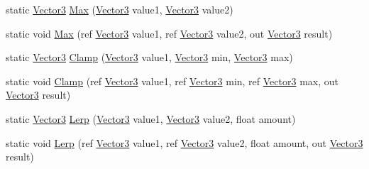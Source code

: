 \begin{DoxyCompactItemize}
\item 
static \hyperlink{struct_microsoft_1_1_xna_1_1_framework_1_1_vector3}{Vector3} \hyperlink{struct_microsoft_1_1_xna_1_1_framework_1_1_vector3_a9cf7048dc7ed52da302507047206cfba}{Max} (\hyperlink{struct_microsoft_1_1_xna_1_1_framework_1_1_vector3}{Vector3} value1, \hyperlink{struct_microsoft_1_1_xna_1_1_framework_1_1_vector3}{Vector3} value2)
\item 
static void \hyperlink{struct_microsoft_1_1_xna_1_1_framework_1_1_vector3_a258028e6718baca3de899a104a27d4ee}{Max} (ref \hyperlink{struct_microsoft_1_1_xna_1_1_framework_1_1_vector3}{Vector3} value1, ref \hyperlink{struct_microsoft_1_1_xna_1_1_framework_1_1_vector3}{Vector3} value2, out \hyperlink{struct_microsoft_1_1_xna_1_1_framework_1_1_vector3}{Vector3} result)
\item 
static \hyperlink{struct_microsoft_1_1_xna_1_1_framework_1_1_vector3}{Vector3} \hyperlink{struct_microsoft_1_1_xna_1_1_framework_1_1_vector3_a1f73c49b5e7cde44b0730444c7936026}{Clamp} (\hyperlink{struct_microsoft_1_1_xna_1_1_framework_1_1_vector3}{Vector3} value1, \hyperlink{struct_microsoft_1_1_xna_1_1_framework_1_1_vector3}{Vector3} min, \hyperlink{struct_microsoft_1_1_xna_1_1_framework_1_1_vector3}{Vector3} max)
\item 
static void \hyperlink{struct_microsoft_1_1_xna_1_1_framework_1_1_vector3_a9dc75c4c2a2ba70c28524f9348ee663b}{Clamp} (ref \hyperlink{struct_microsoft_1_1_xna_1_1_framework_1_1_vector3}{Vector3} value1, ref \hyperlink{struct_microsoft_1_1_xna_1_1_framework_1_1_vector3}{Vector3} min, ref \hyperlink{struct_microsoft_1_1_xna_1_1_framework_1_1_vector3}{Vector3} max, out \hyperlink{struct_microsoft_1_1_xna_1_1_framework_1_1_vector3}{Vector3} result)
\item 
static \hyperlink{struct_microsoft_1_1_xna_1_1_framework_1_1_vector3}{Vector3} \hyperlink{struct_microsoft_1_1_xna_1_1_framework_1_1_vector3_a9e65a924edd5bdbb31429f0ab25d8923}{Lerp} (\hyperlink{struct_microsoft_1_1_xna_1_1_framework_1_1_vector3}{Vector3} value1, \hyperlink{struct_microsoft_1_1_xna_1_1_framework_1_1_vector3}{Vector3} value2, float amount)
\item 
static void \hyperlink{struct_microsoft_1_1_xna_1_1_framework_1_1_vector3_a07379b97d42c2a976449b2468a9dfadb}{Lerp} (ref \hyperlink{struct_microsoft_1_1_xna_1_1_framework_1_1_vector3}{Vector3} value1, ref \hyperlink{struct_microsoft_1_1_xna_1_1_framework_1_1_vector3}{Vector3} value2, float amount, out \hyperlink{struct_microsoft_1_1_xna_1_1_framework_1_1_vector3}{Vector3} result)
\item 

\end{DoxyCompactItemize}
